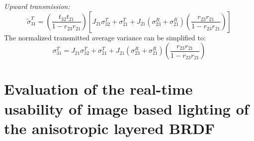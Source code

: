 \textit{Upward transmission:}
\begin{equation}
    \tilde{\sigma}_{31}^T = \left(\frac{t_{32} t_{21}}{1 - r_{23} r_{21}}\right) \left[J_{21} \sigma_{32}^T + \sigma_{21}^T + J_{21} \left(\sigma_{23}^R + \sigma_{21}^R\right) \left(\frac{r_{23} r_{21}}{1 - r_{23} r_{21}}\right)\right]
\end{equation}
The normalized transmitted average variance can be simplified to:
\begin{equation}
    \sigma_{31}^T = J_{21} \sigma_{32}^T + \sigma_{21}^T + J_{21} \left(\sigma_{23}^R + \sigma_{21}^R\right) \left(\frac{r_{23} r_{21}}{1 - r_{23} r_{21}}\right)
\end{equation}

\break

\section{Evaluation of the real-time usability of image based lighting of the anisotropic layered BRDF}
\label{sec:appendix_b}

